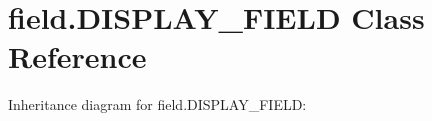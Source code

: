 \hypertarget{classfield_1_1DISPLAY__FIELD}{}\section{field.\+D\+I\+S\+P\+L\+A\+Y\+\_\+\+F\+I\+E\+LD Class Reference}
\label{classfield_1_1DISPLAY__FIELD}


Inheritance diagram for field.\+D\+I\+S\+P\+L\+A\+Y\+\_\+\+F\+I\+E\+LD\+:
